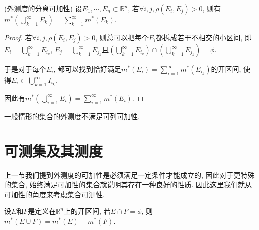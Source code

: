 \documentclass[theorem=false,mathfont=none,openany,sub3section]{easybook}
\begin{document}
\begin{theorem}
  (外测度的分离可加性) 设$E_1, \cdots, E_n\subset \mathbb{R}^n$, 若$\forall i,j, \rho(E_i,E_j)>0$, 则有$m^{*}\left(\bigcup_{k=1}^{\infty}E_k\right)= \sum_{k=1}^{\infty}m^{*}(E_k)$.\par
\end{theorem}

\begin{proof}
  若$\forall i,j, \rho(E_i,E_j)>0$, 则总可以把每个$E_i$都拆成若干不相交的小区间, 即$E_i=\bigcup_{k=1}^{\infty}E_{i_k}$, $E_j=\bigcup_{k=1}^{\infty}E_{j_k}$且$\left(\bigcup_{k=1}^{\infty}E_{i_k}\right)\cap \left(\bigcup_{k=1}^{\infty}E_{j_k}\right) = \phi $.\par
  于是对于每个$E_i$, 都可以找到恰好满足$m^{*}(E_i)=\sum_{i=1}^{\infty}m^{*}(E_{i_k})$的开区间, 使得$E_i\subset \bigcup_{k=1}^{\infty}I_{i_k}$.\par
  因此有$m^{*}\left(\bigcup_{i=1}^{\infty}E_i\right)= \sum_{i=1}^{\infty}m^{*}(E_i)$.\par
\end{proof}

\begin{remark}
  一般情形的集合的外测度不满足可列可加性.\par
\end{remark}

\newpage

\section{可测集及其测度}

上一节我们提到外测度的可加性是必须满足一定条件才能成立的, 因此对于更特殊的集合, 始终满足可加性的集合就说明其存在一种良好的性质. 因此这里我们就从可加性的角度来考虑集合可测性.\par

\begin{theorem}
  设$E$和$F$是定义在$\mathbb{R}^n$上的开区间, 若$E\cap F = \phi$, 则$m^{*}(E\cup F)= m^{*}(E)+m^{*}(F)$.\par
\end{theorem}
\end{document}

